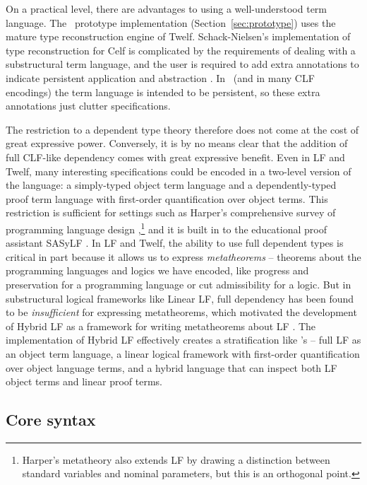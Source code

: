 On a practical level, there are advantages to using a well-understood
term language. The \sls~prototype implementation
(Section~\ref{sec:prototype}) uses the mature type reconstruction
engine of Twelf. Schack-Nielsen's implementation of type
reconstruction for Celf is complicated by the requirements of dealing
with a substructural term language, and the user is required to add
extra annotations to indicate persistent application and abstraction
\cite{schacknielsen08celf}. In \sls~(and in many CLF encodings) the
term language is intended to be persistent, so these extra annotations
just clutter specifications.

The restriction to a dependent type theory therefore does not come at
the cost of great expressive power. Conversely, it is by no means
clear that the addition of full CLF-like dependency comes with great
expressive benefit. Even in LF and Twelf, many interesting
specifications could be encoded in a two-level version of the
language: a simply-typed object term language and a dependently-typed
proof term language with first-order quantification over object
terms. This restriction is sufficient for settings such as Harper's
comprehensive survey of programming language design
\cite{harper12practical},\footnote{Harper's metatheory also extends LF
  by drawing a distinction between standard variables and nominal
  parameters, but this is an orthogonal point.} and it is built in to
the educational proof assistant SASyLF \cite{aldrich08sasylf}. In LF
and Twelf, the ability to use full dependent types is critical in part
because it allows us to express {\it metatheorems} -- theorems about
the programming languages and logics we have encoded, like progress
and preservation for a programming language or cut admissibility for a
logic. But in substructural logical frameworks like Linear LF, full
dependency has been found to be {\it insufficient} for expressing
metatheorems, which motivated the development of Hybrid LF as a
framework for writing metatheorems about LF \cite{reed09hybrid}. The
implementation of Hybrid LF effectively creates a stratification like
\sls's -- full LF as an object term language, a linear logical
framework with first-order quantification over object language terms,
and a hybrid language that can inspect both LF object terms and linear
proof terms.

\subsection{Core syntax}

